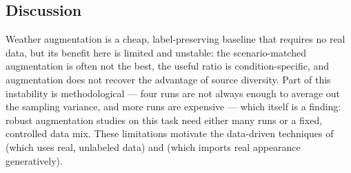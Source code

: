 
\subsection{Discussion}
\label{subsec:aug-discussion}
Weather augmentation is a cheap, label-preserving baseline that requires no real data,
but its benefit here is limited and unstable: the scenario-matched augmentation is
often not the best, the useful ratio is condition-specific, and augmentation does not
recover the advantage of source diversity. Part of this instability is
methodological --- four runs are not always enough to average out the sampling
variance, and more runs are expensive --- which itself is a finding: robust
augmentation studies on this task need either many runs or a fixed, controlled data
mix. These limitations motivate the data-driven techniques of
 (which uses real, unlabeled data) and 
(which imports real appearance generatively).
